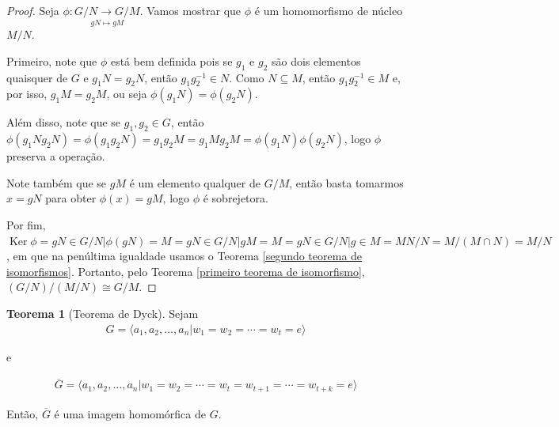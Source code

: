 \documentclass[a4paper,portuguese,11pt,twoside, leqno]{book}
\DeclareMathOperator{\Ker}{Ker}
\theoremstyle{definition}
\newtheorem{theorem}{Teorema}[section]
\begin{document}
	\begin{proof}
		Seja $\phi:\underset{gN\mapsto gM}{G/N\to G/M}$. Vamos mostrar que $\phi$ é um homomorfismo de núcleo $M/N$.
		\par\vspace{0.3cm}
		Primeiro, note que $\phi$ está bem definida pois se $g_1$ e $g_2$ são dois elementos quaisquer de $G$ e $g_1N=g_2N$, então $g_1g_2^{-1}\in N$. Como $N\subseteq M$, então $g_1g_2^{-1}\in M$ e, por isso, $g_1M=g_2M$, ou seja $\phi(g_1N)=\phi(g_2N)$.
		\par\vspace{0.3cm}
		Além disso, note que se $g_1,g_2\in G$, então $\phi(g_1Ng_2N)=\phi(g_1g_2N)=g_1g_2M=g_1Mg_2M=\phi(g_1N)\phi(g_2N)$, logo $\phi$ preserva a operação.
		\par\vspace{0.3cm}
		Note também que se $gM$ é um elemento qualquer de $G/M$, então basta tomarmos $x=gN$ para obter $\phi(x)=gM$, logo $\phi$ é sobrejetora.
		\par\vspace{0.3cm}
		Por fim,  $\Ker\phi={gN\in G/N|\phi(gN)=M}={gN\in G/N|gM=M}={gN\in G/N|g\in M}=MN/N=M/(M\cap N)=M/N$, em que na penúltima igualdade usamos o Teorema \eqref{segundo teorema de isomorfismos}. Portanto, pelo Teorema \eqref{primeiro teorema de isomorfismo}, $(G/N)/(M/N)\cong G/M$. 
	\end{proof}
	
	\par\vspace{0.3cm}
	
	\begin{theorem}[Teorema de Dyck]
		\label{teorema de Dyck}
		Sejam \begin{align*}
		G = \langle a_1, a_2, \dots, a_n | w_1 = w_2 = \cdots = w_t = e \rangle
		\end{align*} 
		\begin{center}
			e
		\end{center} 
		\begin{align*}
		\overline{G} = \langle a_1, a_2, \dots, a_n | w_1 = w_2 = \cdots = w_t = w_{t+1} = \cdots = w_{t+k} = e \rangle
		\end{align*}
		
		\par\vspace{0.3cm} Então, $\overline{G}$ é uma imagem homomórfica de $G$.
		
	\end{theorem}
	
\end{document}
